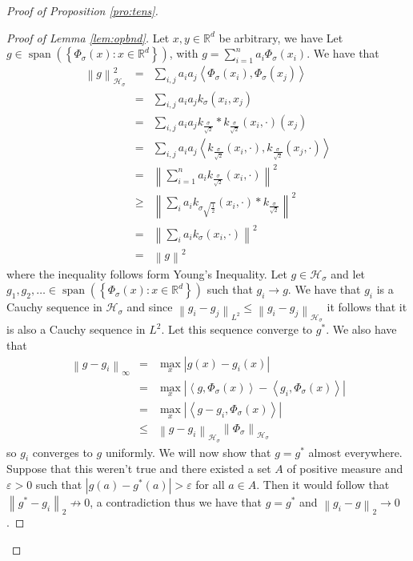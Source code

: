 \documentclass{article} %
\def\hsig{{\mathcal{H}_\sigma}}
\def\fm{{\Phi_\sigma}} %
\def\rn{\mathbb{R}}
\def\l{\left}
\def\r{\right}
\def\span{\operatorname{span}}
\theoremstyle{definition}
\begin{document}
\begin{proof}[Proof of Proposition \ref{pro:tens}]
\begin{proof}[Proof of Lemma \ref{lem:opbnd}]
		Let $x,y \in \rn^d$ be arbitrary, we have
		Let $g \in \span\left( \left\{ \fm(x): x \in \rn^d \right\} \right)$, with $g = \sum_{i=1}^n a_i \fm(x_i)$. We have that 
		\begin{eqnarray*}
			\l\|g \r\|_\hsig^2
			&=& \sum_{i,j} a_i a_j \l<\fm(x_i), \fm(x_j)\r>\\
			&=& \sum_{i,j} a_i a_j k_\sigma\left(x_i,x_j  \right)\\
			&=& \sum_{i,j} a_i a_j k_{\frac{\sigma}{\sqrt{2}}} \ast k_{\frac{\sigma}{\sqrt{2}}}(x_i,\cdot) ( x_j)\\
			&=& \sum_{i,j} a_i a_j \l<k_{\frac{\sigma}{\sqrt{2}}}(x_i,\cdot), k_{\frac{\sigma}{\sqrt{2}}}(x_j,\cdot) \r>\\
			&=& \l\| \sum_{i=1}^n a_i k_{\frac{\sigma}{\sqrt{2}}}(x_i, \cdot)\r\|^2 \\
                        &\ge& \l\| \sum_i a_i k_{\sigma\sqrt{\frac{1}{2}}}\left( x_i,\cdot \right) \ast k_{\frac{\sigma}{\sqrt{2}}} \r\|^2\\
                        &=& \l\| \sum_i a_i k_{\sigma}\left( x_i,\cdot \right)  \r\|^2\\
                        &=& \l\|g\r\|^2
                    \end{eqnarray*}
                    where the inequality follows form Young's Inequality.
                    Let $g \in \hsig$ and let $g_1,g_2,\ldots \in \span\left( \left\{ \fm(x): x\in \rn^d \right\} \right)$ such that $g_i \to g$. We have that $g_i$ is a Cauchy sequence in $\hsig$ and since $\l\|g_i - g_j\r\|_{L^2} \le \l\|g_i - g_j \r\|_\hsig$ it follows that it is also a Cauchy sequence in $L^2$. Let this sequence converge to $g^*$. We also have that
                    \begin{eqnarray*}
                        \l\|g - g_i\r\|_\infty
                        &=& \max_x \l|g(x) - g_i(x)\r|\\
                        &=& \max_x \l|\l<g,\fm(x)\r> - \l<g_i,\fm(x)\r>\r|\\
                        &=& \max_x \l|\l<g-g_i,\fm(x)\r>\r|\\
                        &\le&  \l\|g-g_i\r\|_\hsig \l\|\fm\r\|_\hsig
                    \end{eqnarray*}
                    so $g_i$ converges to $g$ uniformly. We will now show that $g=g^*$ almost everywhere. Suppose that this weren't true and there existed a set $A$ of positive measure and $\varepsilon>0$ such that $\l|g(a) - g^*(a)\r|>\varepsilon$ for all $a\in A$. Then it would follow that $\l\|g^* - g_i\r\|_2 \not\to 0$, a contradiction thus we have that $g = g^*$ and $\l\|g_i - g\r\|_2 \to 0$.
                    

\end{proof}
\end{proof}
\end{document}
